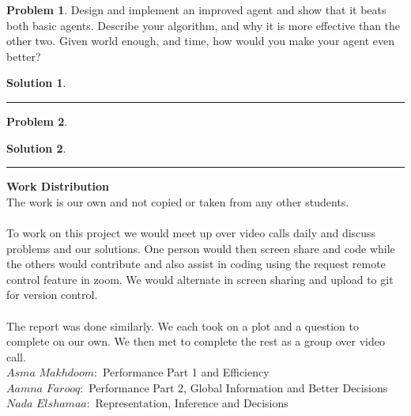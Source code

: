 \documentclass{article}
\theoremstyle{definition}
\newtheorem{problem}{Problem}
\def\fline{\rule{0.75\linewidth}{0.5pt}}
\newcommand{\finishline}{\vspace{-15pt}\begin{center}\fline\end{center}}
\newtheorem*{solution*}{Solution}
\newenvironment{solution}{\begin{solution*}}{{\finishline} \end{solution*}}
\begin{document}
\smallskip

\begin{problem}
Design and implement an improved agent and show that it beats both basic agents.  Describe your algorithm, and why it is more effective than the other two.  Given world enough, and time, how would you make your agent even better?
\end{problem}
\smallskip
\begin{solution}
\end{solution}

\smallskip


\begin{problem}
\end{problem}
\smallskip
\begin{solution}
\end{solution}

\textbf{Work Distribution}
\\
The work is our own and not copied or taken from any other students. 
\\\\
To work on this project we would meet up over video calls daily and discuss problems and our solutions. One person would then screen share and code while the others would contribute and also assist in coding using the request remote control feature in zoom. We would alternate in screen sharing and upload to git for version control. 
\\\\
The report was done similarly. We each took on a plot and a question to complete on our own. We then met to complete the rest as a group over video call. 
\\
$Asma$ $Makhdoom:$ Performance Part 1 and Efficiency
\\
$Aamna$ $Farooq:$ Performance Part 2, Global Information and Better Decisions
\\
$Nada$ $Elshamaa:$ Representation, Inference and Decisions
\\
\smallskip
\end{document}
